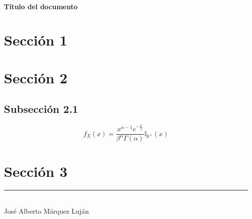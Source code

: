 \documentclass[10pt, landscape]{article}
\title{}
\begin{document}
\footnotesize

\begin{center}
     \Large{\textbf{Título del documento}} \\
\end{center}

\begin{multicols*}{3}
\setlength{\premulticols}{1pt}
\setlength{\postmulticols}{1pt}
\setlength{\multicolsep}{1pt}
\setlength{\columnsep}{2pt}

\setlength{\abovedisplayskip}{0.25em}
\setlength{\belowdisplayskip}{0.25em}
\setlength{\abovedisplayshortskip}{0.25em}
\setlength{\belowdisplayshortskip}{0.25em}


\section{Sección 1}
\lipsum[1-3]

\section{Sección 2}
\lipsum[4-6]

\subsection{Subsección 2.1}
\lipsum[7-8]

\[ f_X(x) = \frac{x^{\alpha - 1} e^{-\frac{x}{\beta}}}{\beta^\alpha \Gamma(\alpha)} \mathbb{I}_{\mathbb{R^{+}}}(x) \]

\lipsum[9]

\section{Sección 3}
\lipsum[10-14]


\vfill
\begin{flushright}
    \rule{0.65\linewidth}{0.1pt} \\
    José Alberto Márquez Luján
\end{flushright}

\end{multicols*}
\end{document}
